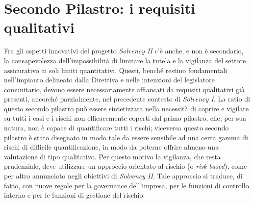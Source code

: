 \section{Secondo Pilastro: i requisiti qualitativi}
Fra gli aspetti innovativi del progetto \textit{\textit{Solvency I}I} c’è anche, e non è secondario, la consapevolezza dell’impossibilità di limitare la tutela e la vigilanza del settore assicurativo ai soli limiti quantitativi.
Questi, benché restino fondamentali nell’impianto delineato dalla Direttiva e nelle intenzioni del legislatore comunitario, devono essere necessariamente affiancati da requisiti qualitativi già presenti, ancorché parzialmente, nel precedente contesto di \textit{Solvency I}.
La ratio di questo secondo pilastro può essere sintetizzata nella necessità di coprire e vigilare su tutti i casi e i rischi non efficacemente coperti dal primo pilastro, che, per sua natura, non è capace di quantificare tutti i rischi; viceversa questo secondo pilastro è stato disegnato in modo tale da essere sensibile ad una certa gamma di rischi di difficile quantificazione, in modo da poterne offrire almeno una valutazione di tipo qualitativo.
Per questo motivo la vigilanza, che resta prudenziale, deve utilizzare un approccio orientato al rischio (o {\itshape risk based}), come per altro annunciato negli obiettivi di \textit{\textit{Solvency I}I}. Tale approccio si traduce, di fatto, con nuove regole per la governance dell’impresa, per le funzioni di controllo interno e per le funzioni di gestione del rischio.

